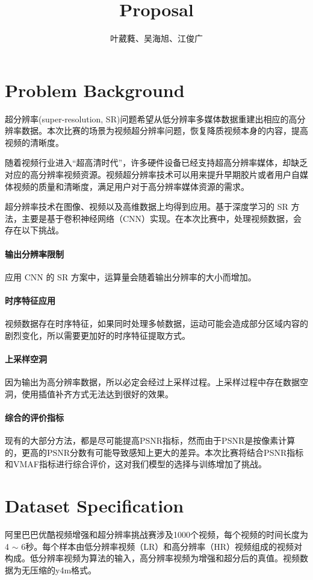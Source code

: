 \documentclass{article}
\title{Proposal}
\author{
	叶葳蕤、吴海旭、江俊广\\
}
\begin{document}

\maketitle

\section{Problem Background}
超分辨率(super-resolution, SR)问题希望从低分辨率多媒体数据重建出相应的高分辨率数据。本次比赛的场景为视频超分辨率问题，恢复降质视频本身的内容，提高视频的清晰度。


随着视频行业进入“超高清时代”，许多硬件设备已经支持超高分辨率媒体，却缺乏对应的高分辨率视频资源。视频超分辨率技术可以用来提升早期胶片或者用户自媒体视频的质量和清晰度，满足用户对于高分辨率媒体资源的需求。


超分辨率技术在图像、视频以及高维数据上均得到应用。基于深度学习的 SR 方法，主要是基于卷积神经网络（CNN）实现。在本次比赛中，处理视频数据，会存在以下挑战。


\paragraph{输出分辨率限制} 应用 CNN 的 SR 方案中，运算量会随着输出分辨率的大小而增加。
\paragraph{时序特征应用} 视频数据存在时序特征，如果同时处理多帧数据，运动可能会造成部分区域内容的剧烈变化，所以需要更加好的时序特征提取方式。
\paragraph{上采样空洞} 因为输出为高分辨率数据，所以必定会经过上采样过程。上采样过程中存在数据空洞，使用插值补齐方式无法达到很好的效果。
\paragraph{综合的评价指标} 现有的大部分方法，都是尽可能提高PSNR指标，然而由于PSNR是按像素计算的，更高的PSNR分数有可能导致感知上更大的差异。本次比赛将结合PSNR指标和VMAF指标进行综合评价，这对我们模型的选择与训练增加了挑战。

\section{Dataset Specification}
阿里巴巴优酷视频增强和超分辨率挑战赛\cite{competition}涉及1000个视频，每个视频的时间长度为4 $\sim$ 6秒。每个样本由低分辨率视频（LR）和高分辨率（HR）视频组成的视频对构成。低分辨率视频为算法的输入，高分辨率视频为增强和超分后的真值。视频数据为无压缩的y4m格式。
\end{document}
